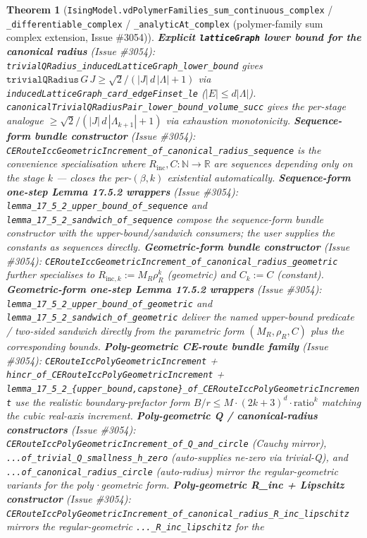 \documentclass[a4paper,11pt]{article}
\newtheorem{theorem}{Theorem}
\begin{document}
\begin{theorem}[\texttt{IsingModel.vdPolymerFamilies\_sum\_continuous\_complex} /
\texttt{\_differentiable\_complex} / \texttt{\_analyticAt\_complex} (polymer-family sum
complex extension, Issue \#3054)]
\textbf{Explicit \texttt{latticeGraph} lower bound for the canonical radius}
(Issue \#3054):
\texttt{trivialQRadius\_inducedLatticeGraph\_lower\_bound} gives
\(\texttt{trivialQRadius}\,G\,J\ge\sqrt{2}/(|J|\,d\,|\Lambda|+1)\) via
\texttt{inducedLatticeGraph\_card\_edgeFinset\_le} (\(|E|\le d|\Lambda|\)).
\texttt{canonicalTrivialQRadiusPair\_lower\_bound\_volume\_succ} gives the
per-stage analogue
\(\ge\sqrt{2}/(|J|\,d\,|\Lambda_{k+1}|+1)\) via exhaustion monotonicity.
\textbf{Sequence-form bundle constructor} (Issue \#3054):
\texttt{CERouteIccGeometricIncrement\_of\_canonical\_radius\_sequence} is the
convenience specialisation where \(R_{\mathrm{inc}}, C:\mathbb{N}\to\mathbb{R}\)
are sequences depending only on the stage \(k\) — closes the per-\((\beta,k)\)
existential automatically.
\textbf{Sequence-form one-step Lemma 17.5.2 wrappers} (Issue \#3054):
\texttt{lemma\_17\_5\_2\_upper\_bound\_of\_sequence} and
\texttt{lemma\_17\_5\_2\_sandwich\_of\_sequence} compose the sequence-form
bundle constructor with the upper-bound/sandwich consumers; the user supplies
the constants as sequences directly.
\textbf{Geometric-form bundle constructor} (Issue \#3054):
\texttt{CERouteIccGeometricIncrement\_of\_canonical\_radius\_geometric}
further specialises to \(R_{\mathrm{inc},k}:=M_R\rho_R^k\) (geometric) and
\(C_k:=C\) (constant).
\textbf{Geometric-form one-step Lemma 17.5.2 wrappers} (Issue \#3054):
\texttt{lemma\_17\_5\_2\_upper\_bound\_of\_geometric} and
\texttt{lemma\_17\_5\_2\_sandwich\_of\_geometric} deliver the named
upper-bound predicate / two-sided sandwich directly from the parametric form
\((M_R, \rho_R, C)\) plus the corresponding bounds.
\textbf{Poly-geometric CE-route bundle family} (Issue \#3054):
\texttt{CERouteIccPolyGeometricIncrement} +
\texttt{hincr\_of\_CERouteIccPolyGeometricIncrement} +
\texttt{lemma\_17\_5\_2\_\{upper\_bound,capstone\}\_of\_CERouteIccPolyGeometricIncrement}
use the realistic boundary-prefactor form \(B/r\le M\cdot(2k+3)^d\cdot\mathrm{ratio}^k\)
matching the cubic real-axis increment.
\textbf{Poly-geometric Q / canonical-radius constructors} (Issue \#3054):
\texttt{CERouteIccPolyGeometricIncrement\_of\_Q\_and\_circle} (Cauchy mirror),
\texttt{...of\_trivial\_Q\_smallness\_h\_zero} (auto-supplies ne-zero via
trivial-Q), and \texttt{...of\_canonical\_radius\_circle} (auto-radius)
mirror the regular-geometric variants for the poly·geometric form.
\textbf{Poly-geometric R\_inc + Lipschitz constructor} (Issue \#3054):
\texttt{CERouteIccPolyGeometricIncrement\_of\_canonical\_radius\_R\_inc\_lipschitz}
mirrors the regular-geometric \texttt{...\_R\_inc\_lipschitz} for the

\end{theorem}
\end{document}
